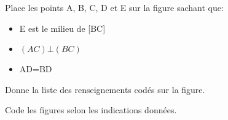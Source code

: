 


\begin{exercice}
Place les points A, B, C, D et E sur la figure sachant que:
\begin{itemize}
    \item E est le milieu de [BC]
	\item $(AC)\bot (BC)$
    \item AD=BD
\end{itemize}
\begin{center}
    
\end{center}
\end{exercice}

\begin{exercice}
Donne la liste des renseignements codés sur la figure.
\begin{center}
    
\end{center}
\end{exercice}

\begin{exercice}[coder]
Code les figures selon les indications données.
\begin{colenumerate}{2}
 \item
 

  \item
  

  \item
  

  \item


 \end{colenumerate}
\end{exercice}

